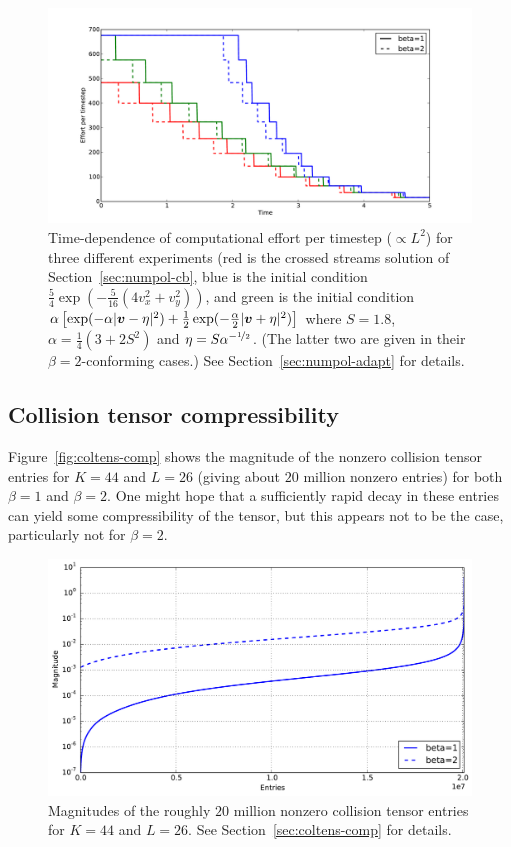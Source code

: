 \begin{figure}
    \centering
    \includegraphics[width=14cm]{figs/polboltz/adapt}
    \caption{Time-dependence of computational effort per timestep ($\propto L^2$) for three different
    experiments (red is the crossed streams solution of Section~\vref{sec:numpol-cb}, blue is the initial
    condition $\frac{5}{4}\exp(-\frac{5}{16}(4v_x^2+v_y^2))$, and green is the initial condition
    $\alpha\left[\exp(-\alpha|{\bm v}-\eta|^2) + \frac{1}{2}\exp(-\frac{\alpha}{2}|{\bm v}+\eta|^2)\right]$ where
    $S=1.8$, $\alpha=\frac{1}{4}(3+2S^2)$ and $\eta=S\alpha^{-\nicefrac{1}{2}}$. (The latter two are given in
    their $\beta=2$-conforming cases.) See Section~\vref{sec:numpol-adapt} for details.}
    \label{fig:numpol-adapt}
\end{figure}

\subsection{Collision tensor compressibility} \label{sec:coltens-comp}

Figure~\vref{fig:coltens-comp} shows the magnitude of the nonzero collision tensor entries for $K=44$ and
$L=26$ (giving about $20$ million nonzero entries) for both $\beta=1$ and $\beta=2$. One might hope that a
sufficiently rapid decay in these entries can yield some compressibility of the tensor, but this appears not
to be the case, particularly not for $\beta=2$.

\begin{figure}
    \centering
    \includegraphics[width=12cm]{figs/polboltz/spectrum}
    \caption{Magnitudes of the roughly $20$ million nonzero collision tensor entries for $K=44$ and $L=26$.
    See Section~\vref{sec:coltens-comp} for details.}
    \label{fig:coltens-comp}
\end{figure}

